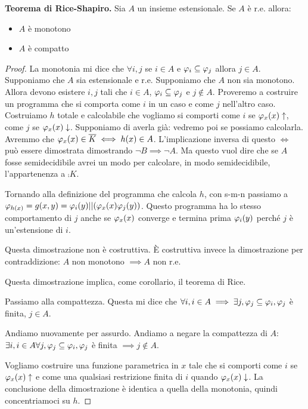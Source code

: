\begin{thm}
    \textbf{Teorema di Rice-Shapiro. }Sia $A$ un insieme estensionale. Se $A$ è r.e. allora:
    \begin{itemize}
        \item $A$ è monotono
        \item $A$ è compatto
    \end{itemize}
\end{thm}
\begin{proof}
    La monotonia mi dice che $\forall i,j$ se $i \in A$ e $\varphi_{i} \subseteq \varphi_{j}$ allora $j \in
    A$. Supponiamo che $A$ sia estensionale e r.e. Supponiamo che $A$ non sia monotono. Allora
    devono esistere $i,j$ tali che $i \in A$, $\varphi_{i} \subseteq \varphi_{j}$ e $j \notin A$. Proveremo a
    costruire un programma che si comporta come $i$ in un caso e come $j$ nell'altro caso.
    Costruiamo $h$ totale e calcolabile che vogliamo si comporti come $i$ se $\varphi_{x}(x) \uparrow$,
    come $j$ se $\varphi_{x}(x) \downarrow$. Supponiamo di averla già: vedremo poi se possiamo
    calcolarla. Avremmo che $\varphi_{x}(x) \in \overline{K} \iff h(x) \in A$. L'implicazione inversa di questo
    $\iff$ può essere dimostrata dimostrando $\lnot B \implies \lnot A$. Ma questo vuol dire che se
    $A$ fosse semidecidibile avrei un modo per calcolare, in modo semidecidibile, l'appartenenza a
    $\comp{K}$. 

    Tornando alla definizione del programma che calcola $h$, con s-m-n passiamo a $\varphi_{h(x)} = g(x,y)
    = \varphi_{i}(y) || (\varphi_{x}(x)\varphi_{j}(y))$. Questo programma ha lo stesso comportamento di $j$ anche se
    $\varphi_{x}(x)$ converge e termina prima $\varphi_{i}(y)$ perché $j$ è un'estensione di $i$. 

    Questa dimostrazione non è costruttiva. È costruttiva invece la dimostrazione per
    contraddizione: $A$ non monotono $\implies A$ non r.e.

    Questa dimostrazione implica, come corollario, il teorema di Rice.

    Passiamo alla compattezza. Questa mi dice che $\forall i, i \in A \implies \exists j, \varphi_{j} \subseteq
    \varphi_{i}, \varphi_{j}$ è finita, $j \in A$.

    Andiamo nuovamente per assurdo. Andiamo a negare la compattezza di $A$: $\exists i, i \in A
    \forall j, \varphi_{j} \subseteq \varphi_{i}, \varphi_{j}$ è finita $\implies j \notin A$.

    Vogliamo costruire una funzione parametrica in $x$ tale che si comporti come $i$ se $\varphi_{x}(x)
    \uparrow$ e come una qualsiasi restrizione finita di $i$ quando $\varphi_{x}(x) \downarrow$. La
    conclusione della dimostrazione è identica a quella della monotonia, quindi concentriamoci su
    $h$. 


\end{proof}
